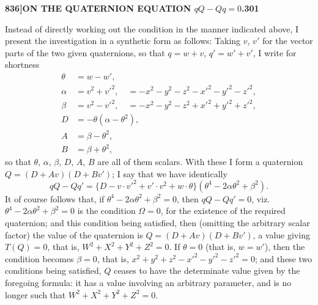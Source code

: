 \documentclass[12pt,a4paper]{article}
\theoremstyle{definition}
\begin{document}
\setcounter{page}{301}


\noindent\textbf{836]}\hfill\textbf{ON THE QUATERNION EQUATION $qQ - Qq = 0$.}\hfill\textbf{301}

\bigskip

\noindent Instead of directly working out the condition in the manner indicated above, I present the investigation in a synthetic form as follows: Taking $v$, $v'$ for the vector parts of the two given quaternions, so that $q = w + v$, $q' = w' + v'$, I write for shortness
\begin{align*}
\theta &= w - w', \\
\alpha &= v^2 + v'^2, \quad = -x^2 - y^2 - z^2 - x'^2 - y'^2 - z'^2, \\
\beta &= v^2 - v'^2, \quad = -x^2 - y^2 - z^2 + x'^2 + y'^2 + z'^2, \\
D &= -\theta(\alpha - \theta^2), \\
A &= \beta - \theta^2, \\
B &= \beta + \theta^2,
\end{align*}
so that $\theta$, $\alpha$, $\beta$, $D$, $A$, $B$ are all of them scalars. With these I form a quaternion $Q = (D + Av)(D + Bv')$; I say that we have identically
\[
qQ - Qq' = \{D - v \cdot v'^2 + v' \cdot v^2 + w \cdot \theta\}(\theta^4 - 2\alpha\theta^2 + \beta^2).
\]
It of course follows that, if $\theta^4 - 2\alpha\theta^2 + \beta^2 = 0$, then $qQ - Qq' = 0$, viz.\ $\theta^4 - 2\alpha\theta^2 + \beta^2 = 0$ is the condition $\Omega = 0$, for the existence of the required quaternion; and this condition being satisfied, then (omitting the arbitrary scalar factor) the value of the quaternion is $Q = (D + Av)(D + Bv')$, a value giving $T(Q) = 0$, that is, $W^2 + X^2 + Y^2 + Z^2 = 0$. If $\theta = 0$ (that is, $w = w'$), then the condition becomes $\beta = 0$, that is, $x^2 + y^2 + z^2 - x'^2 - y'^2 - z'^2 = 0$; and these two conditions being satisfied, $Q$ ceases to have the determinate value given by the foregoing formula: it has a value involving an arbitrary parameter, and is no longer such that $W^2 + X^2 + Y^2 + Z^2 = 0$.
\end{document}
